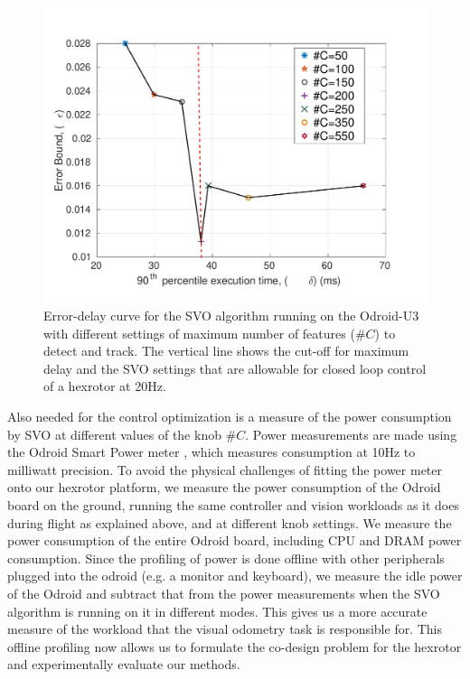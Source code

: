 \begin{figure}[htb]
\centering
\includegraphics[width=0.99\columnwidth]{figures/errVsTime}
\vspace{-10pt}
\caption{Error-delay curve for the SVO algorithm running on the Odroid-U3 with different settings of maximum number of features ($\#C$) to detect and track. The vertical line shows the cut-off for maximum delay and the SVO settings that are allowable for closed loop control of a hexrotor at 20Hz.}
\label{fig:svo_error_delay}
\vspace{-10pt}
\end{figure}


Also needed for the control optimization %
is a measure of the power consumption by SVO at different values of the knob $\#C$. 
Power measurements are made using the Odroid Smart Power meter \cite{OdroidSmartPower}, which measures consumption at 10Hz to milliwatt precision. 
To avoid the physical challenges of fitting the power meter onto our hexrotor platform, we measure the power consumption of the Odroid board on the ground, running the same controller and vision workloads as it does during flight as explained above, and at different knob settings.
We measure the power consumption of the entire Odroid board, including CPU and DRAM power consumption. 
Since the profiling of power is done offline with other peripherals plugged into the odroid (e.g. a monitor and keyboard), we measure the idle power of the Odroid and subtract that from the power measurements when the SVO algorithm is running on it in different modes. 
This gives us a more accurate measure of the workload that the visual odometry task is responsible for. 
This offline profiling now allows us to formulate the co-design problem for the hexrotor and experimentally evaluate our methods.


